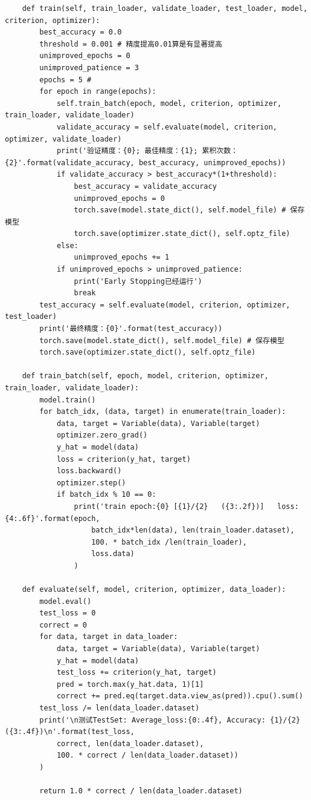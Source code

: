 \documentclass[UTF8]{article}
\begin{document}
\begin{lstlisting}
    def train(self, train_loader, validate_loader, test_loader, model, criterion, optimizer):
        best_accuracy = 0.0
        threshold = 0.001 # 精度提高0.01算是有显著提高
        unimproved_epochs = 0
        unimproved_patience = 3
        epochs = 5 #
        for epoch in range(epochs):
            self.train_batch(epoch, model, criterion, optimizer, train_loader, validate_loader)
            validate_accuracy = self.evaluate(model, criterion, optimizer, validate_loader)
            print('验证精度：{0}; 最佳精度：{1}; 累积次数：{2}'.format(validate_accuracy, best_accuracy, unimproved_epochs))
            if validate_accuracy > best_accuracy*(1+threshold):
                best_accuracy = validate_accuracy
                unimproved_epochs = 0
                torch.save(model.state_dict(), self.model_file) # 保存模型
                torch.save(optimizer.state_dict(), self.optz_file)
            else:
                unimproved_epochs += 1
            if unimproved_epochs > unimproved_patience:
                print('Early Stopping已经运行')
                break
        test_accuracy = self.evaluate(model, criterion, optimizer, test_loader)
        print('最终精度：{0}'.format(test_accuracy))
        torch.save(model.state_dict(), self.model_file) # 保存模型
        torch.save(optimizer.state_dict(), self.optz_file)
    
    def train_batch(self, epoch, model, criterion, optimizer, train_loader, validate_loader):
        model.train()
        for batch_idx, (data, target) in enumerate(train_loader):
            data, target = Variable(data), Variable(target)
            optimizer.zero_grad()
            y_hat = model(data)
            loss = criterion(y_hat, target)
            loss.backward()
            optimizer.step()
            if batch_idx % 10 == 0:
                print('train epoch:{0} [{1}/{2}   ({3:.2f})]   loss:{4:.6f}'.format(epoch, 
                    batch_idx*len(data), len(train_loader.dataset), 
                    100. * batch_idx /len(train_loader), 
                    loss.data)
                )

    def evaluate(self, model, criterion, optimizer, data_loader):
        model.eval()
        test_loss = 0
        correct = 0
        for data, target in data_loader:
            data, target = Variable(data), Variable(target)
            y_hat = model(data)
            test_loss += criterion(y_hat, target)
            pred = torch.max(y_hat.data, 1)[1]
            correct += pred.eq(target.data.view_as(pred)).cpu().sum()
        test_loss /= len(data_loader.dataset)
        print('\n测试TestSet: Average_loss:{0:.4f}, Accuracy: {1}/{2} ({3:.4f})\n'.format(test_loss, 
            correct, len(data_loader.dataset), 
            100. * correct / len(data_loader.dataset))
        )

        return 1.0 * correct / len(data_loader.dataset)
\end{lstlisting}
\end{document}
